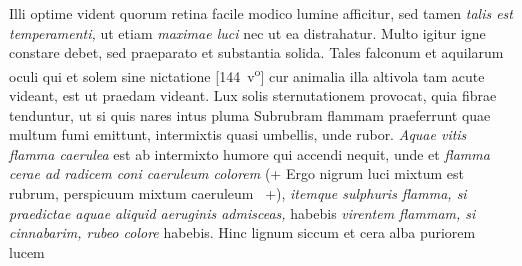 Illi optime vident quorum retina facile modico lumine afficitur, sed tamen \textit{talis est temperamenti,} ut etiam \textit{maximae luci } nec ut ea distrahatur. Multo igitur igne constare debet, sed praeparato et substantia solida. Tales falconum et aquilarum oculi qui et solem sine nictatione\protect{}
%
% 
[144~v\textsuperscript{o}]
%
 cur animalia illa altivola\protect{} tam acute videant, est ut praedam videant. Lux solis sternutationem\protect{} provocat, quia fibrae tenduntur, ut si quis nares intus pluma  Subrubram flammam praeferrunt quae multum fumi emittunt, intermixtis quasi umbellis, unde rubor. \textit{Aquae vitis flamma caerulea} est ab intermixto humore qui accendi nequit, unde et \textit{flamma cerae ad radicem coni caeruleum colorem } (+ Ergo nigrum luci mixtum est rubrum, perspicuum mixtum caeruleum\protect{} \Denarius\ +), \textit{itemque sulphuris flamma, si praedictae aquae aliquid aeruginis\protect{} admisceas,} habebis 
\textit{virentem flammam, si cinnabarim\protect{}, rubeo colore} habebis. Hinc lignum siccum et cera alba puriorem lucem
